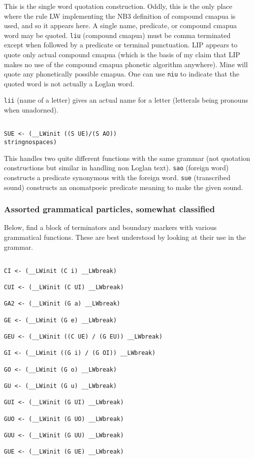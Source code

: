 \documentclass[12pt]{article}
\begin{document}
This is the single word quotation construction.  Oddly, this is the only place where the rule LW implementing the
NB3 definition of compound cmapua is used, and so it appears here.  A single name, predicate, or compound cmapua word
may be quoted.  {\tt liu} (compound cmapua) must be comma terminated except when followed by a predicate or terminal punctuation.  LIP appears to quote only actual compound cmapua (which is the basis of my claim that LIP makes no use of the compound cmapua phonetic algorithm anywhere).  Mine will quote any phonetically possible cmapua.  One can use
{\tt niu} to indicate that the quoted word is not actually a Loglan word.

{\tt lii} (name of a letter) gives an actual name for a letter (letterals being pronouns when unadorned).

\begin{verbatim}

SUE <- (__LWinit ((S UE)/(S AO)) 
stringnospaces)

\end{verbatim}

This handles two quite different functions with the same grammar (not quotation constructions but similar in handling non Loglan text).  {\tt sao} (foreign word) constructs a predicate
synonymous with the foreign word.
{\tt sue} (transcribed sound) constructs an onomatpoeic predicate meaning to make the given sound.

\subsubsection{Assorted grammatical particles, somewhat classified}


Below, find a block of terminators and boundary markers with various grammatical functions.  These are best understood by looking
at their use in the grammar.

\begin{verbatim}

CI <- (__LWinit (C i) __LWbreak)

CUI <- (__LWinit (C UI) __LWbreak)

GA2 <- (__LWinit (G a) __LWbreak)

GE <- (__LWinit (G e) __LWbreak)

GEU <- (__LWinit ((C UE) / (G EU)) __LWbreak)

GI <- (__LWinit ((G i) / (G OI)) __LWbreak)

GO <- (__LWinit (G o) __LWbreak)

GU <- (__LWinit (G u) __LWbreak)

GUI <- (__LWinit (G UI) __LWbreak)

GUO <- (__LWinit (G UO) __LWbreak)

GUU <- (__LWinit (G UU) __LWbreak)

GUE <- (__LWinit (G UE) __LWbreak)

\end{verbatim}
\end{document}
